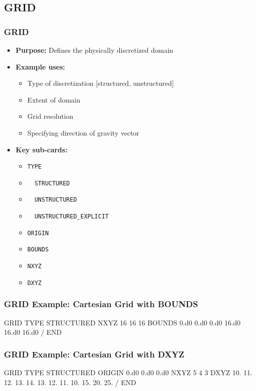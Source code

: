 \subsection{GRID}

\begin{frame}\frametitle{GRID}

\begin{itemize}
\item[] \textbf{Purpose:} Defines the physically discretized domain
\item[] \textbf{Example uses:}
\begin{itemize}
  \item Type of discretization [structured, unstructured]
  \item Extent of domain
  \item Grid resolution
  \item Specifying direction of gravity vector
\end{itemize}
\item[] \textbf{Key sub-cards:}
\begin{itemize}
  \item[] \verb|TYPE|
  \item[] \verb|  STRUCTURED|
  \item[] \verb|  UNSTRUCTURED|
  \item[] \verb|  UNSTRUCTURED_EXPLICIT|
  \item[] \verb|ORIGIN|
  \item[] \verb|BOUNDS|
  \item[] \verb|NXYZ|
  \item[] \verb|DXYZ|
\end{itemize}
\end{itemize}

\end{frame}

\begin{frame}[fragile]\frametitle{GRID Example: Cartesian Grid with BOUNDS}

\begin{semiverbatim}
GRID
  TYPE STRUCTURED
  NXYZ 16 16 16
  BOUNDS
    0.d0 0.d0 0.d0
    16.d0 16.d0 16.d0
  /
END
\end{semiverbatim}

\end{frame}

\begin{frame}[fragile]\frametitle{GRID Example: Cartesian Grid with DXYZ}

\begin{semiverbatim}
GRID
  TYPE STRUCTURED
  ORIGIN 0.d0 0.d0 0.d0
  NXYZ 5 4 3
  DXYZ
    10. 11. 12. 13. 14.
    13. 12. 11. 10.
    15. 20. 25.
  /
END
\end{semiverbatim}

\end{frame}

